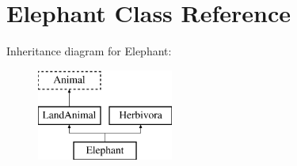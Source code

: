 \hypertarget{classElephant}{\section{Elephant Class Reference}
\label{classElephant}
}
Inheritance diagram for Elephant\-:\begin{figure}[H]
\begin{center}
\leavevmode
\includegraphics[height=3.000000cm]{classElephant}
\end{center}
\end{figure}

